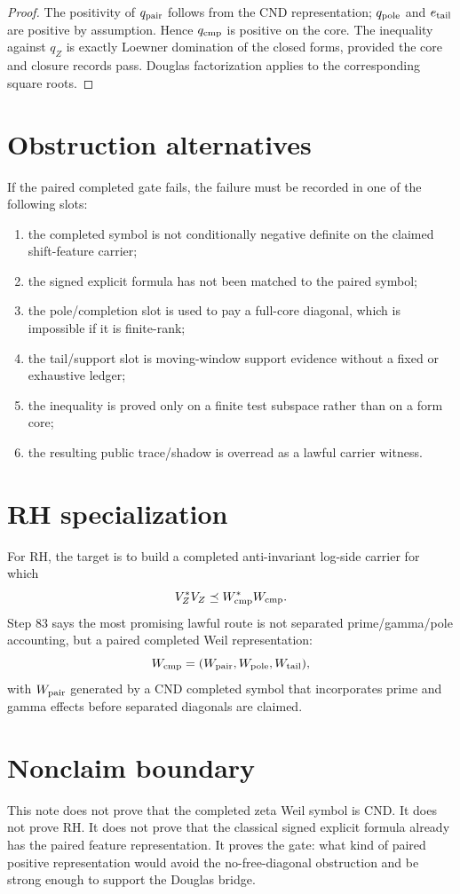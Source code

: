 \documentclass[11pt]{article}
\begin{document}
\begin{proof}
The positivity of \(q_{\rm pair}\) follows from the CND representation; \(q_{\rm pole}\) and \(e_{\rm tail}\) are positive by assumption.  Hence \(q_{\rm cmp}\) is positive on the core.  The inequality against \(q_Z\) is exactly Loewner domination of the closed forms, provided the core and closure records pass.  Douglas factorization applies to the corresponding square roots.
\end{proof}

\section{Obstruction alternatives}

If the paired completed gate fails, the failure must be recorded in one of the following slots:
\begin{enumerate}[label=(O\arabic*)]
\item the completed symbol is not conditionally negative definite on the claimed shift-feature carrier;
\item the signed explicit formula has not been matched to the paired symbol;
\item the pole/completion slot is used to pay a full-core diagonal, which is impossible if it is finite-rank;
\item the tail/support slot is moving-window support evidence without a fixed or exhaustive ledger;
\item the inequality is proved only on a finite test subspace rather than on a form core;
\item the resulting public trace/shadow is overread as a lawful carrier witness.
\end{enumerate}

\section{RH specialization}

For RH, the target is to build a completed anti-invariant log-side carrier for which
\[
V_Z^*V_Z\preceq W_{\rm cmp}^*W_{\rm cmp}.
\]
Step 83 says the most promising lawful route is not separated prime/gamma/pole accounting, but a paired completed Weil representation:
\[
W_{\rm cmp}=(W_{\rm pair},W_{\rm pole},W_{\rm tail}),
\]
with \(W_{\rm pair}\) generated by a CND completed symbol that incorporates prime and gamma effects before separated diagonals are claimed.

\section{Nonclaim boundary}

This note does not prove that the completed zeta Weil symbol is CND.  It does not prove RH.  It does not prove that the classical signed explicit formula already has the paired feature representation.  It proves the gate: what kind of paired positive representation would avoid the no-free-diagonal obstruction and be strong enough to support the Douglas bridge.
\end{document}
